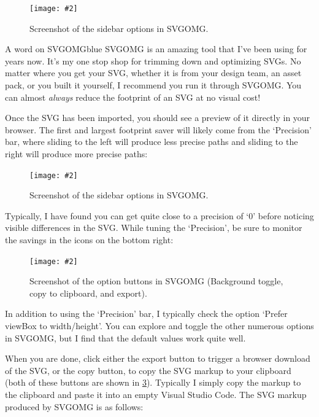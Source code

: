 \documentclass[paper=6in:9in,pagesize=pdftex,headinclude=on,footinclude=on,12pt,twoside]{scrbook}
\newcommand{\standardfigure}[3]{\begin{figure}[H]\begin{center}\texttt{[image: \#2]}\caption{#3}\label{fig:#2}\end{center}\end{figure}}
\begin{document}
\standardfigure{\textwidth}{frontend/logo-design/svgomg-sidebar}{Screenshot of the sidebar options in SVGOMG.}

\begin{highlightBox}{A word on SVGOMG}{blue}{\information}
SVGOMG is an amazing tool that I've been using for years now. It's my one stop shop for trimming down and optimizing SVGs. No matter where you get your SVG, whether it is from your design team, an asset pack, or you built it yourself, I recommend you run it through SVGOMG. You can almost \textit{always} reduce the footprint of an SVG at no visual cost!
\end{highlightBox}

Once the SVG has been imported, you should see a preview of it directly in your browser. The first and largest footprint saver will likely come from the `Precision' bar, where sliding to the left will produce less precise paths and sliding to the right will produce more precise paths:

\standardfigure{\textwidth}{frontend/logo-design/svgomg-precision-bar}{Screenshot of the sidebar options in SVGOMG.}

Typically, I have found you can get quite close to a precision of `0' before noticing visible differences in the SVG. While tuning the `Precision', be sure to monitor the savings in the icons on the bottom right:

\standardfigure{\textwidth}{frontend/logo-design/svgomg-icons}{Screenshot of the option buttons in SVGOMG (Background toggle, copy to clipboard, and export).}

In addition to using the `Precision' bar, I typically check the option `Prefer viewBox to width/height'. You can explore and toggle the other numerous options in SVGOMG, but I find that the default values work quite well.

When you are done, click either the export button to trigger a browser download of the SVG, or the copy button, to copy the SVG markup to your clipboard (both of these buttons are shown in \ref{fig:frontend/logo-design/svgomg-icons}). Typically I simply copy the markup to the clipboard and paste it into an empty Visual Studio Code. The SVG markup produced by SVGOMG is as follows:
\end{document}
